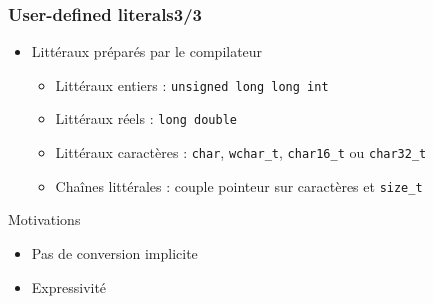 \documentclass[C++.tex]{subfiles}
\begin{document}
\begin{frame}[fragile]
	\frametitle{User-defined literals\titlehfill{}3/3}
	\begin{itemize}
		\item Littéraux \og préparés\fg{} par le compilateur
		\begin{itemize}
			\item Littéraux entiers : \lstinline|unsigned long long int|
			\item Littéraux réels : \lstinline|long double|
			\item Littéraux caractères : \lstinline|char|, \lstinline|wchar_t|, \lstinline|char16_t| ou \lstinline|char32_t|
			\item Chaînes littérales : couple pointeur sur caractères et \lstinline|size_t|
		\end{itemize}
	\end{itemize}

	\begin{block}{Motivations}
		\begin{itemize}
			\item Pas de conversion implicite
			\item Expressivité

		\end{itemize}
	\end{block}
\end{frame}
\end{document}
